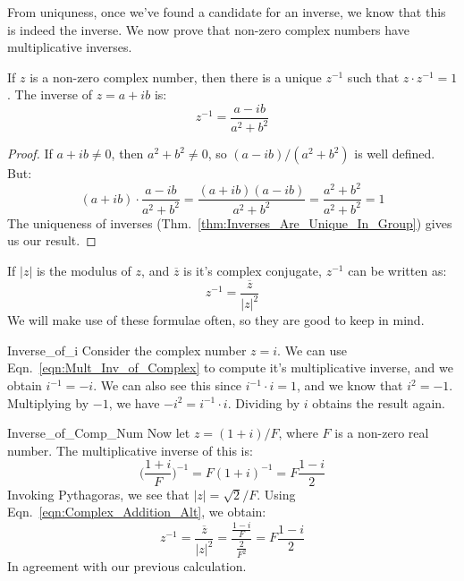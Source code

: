     From uniquness, once we've found a candidate for an inverse, we know
    that this is indeed the inverse. We now prove
    that non-zero complex numbers have multiplicative inverses.
    \begin{theorem}
        \label{thm:Complex_Inverse}%
        If $z$ is a non-zero complex number, then there is a unique
        $z^{\minus{1}}$ such that $z\cdot{z}^{\minus{1}}=1$.
        The inverse of $z=a+ib$ is:
        \begin{equation}
            \label{eqn:Mult_Inv_of_Complex}%
            z^{\minus{1}}=\frac{a-ib}{a^{2}+b^{2}}
        \end{equation}
    \end{theorem}
    \begin{proof}
        If $a+ib\ne{0}$, then $a^2+b^2\ne{0}$, so
        $(a-ib)/(a^2+b^2)$ is well defined. But:
        \begin{equation}
            (a+ib)\cdot\frac{a-ib}{a^2+b^2}=\frac{(a+ib)(a-ib)}{a^2+b^2}
                                           =\frac{a^2+b^2}{a^2+b^2}=1
        \end{equation}
        The uniqueness of inverses
        (Thm.~\ref{thm:Inverses_Are_Unique_In_Group}) gives us our result.
    \end{proof}
    If $|z|$ is the modulus of $z$, and $\overline{z}$ is it's complex
    conjugate, $z^{\minus{1}}$ can be written as:
    \begin{equation}
        \label{eqn:Complex_Addition_Alt}%
        z^{\minus{1}}=\frac{\overline{z}}{|z|^{2}}
    \end{equation}
    We will make use of these formulae often, so they are
    good to keep in mind.
    \begin{lexample}{}{Inverse_of_i}
        Consider the complex number $z=i$. We can use
        Eqn.~\ref{eqn:Mult_Inv_of_Complex} to compute it's
        multiplicative inverse, and we obtain $i^{\minus{1}}=\minus{i}$.
        We can also see this since $i^{\minus{1}}\cdot{i}=1$, and we
        know that $i^{2}=\minus{1}$. Multiplying by $\minus{1}$,
        we have $\minus{i}^{2}=i^{\minus{1}}\cdot{i}$. Dividing by $i$
        obtains the result again.
    \end{lexample}
    \begin{lexample}{}{Inverse_of_Comp_Num}
        Now let $z=(1+i)/F$, where $F$ is a non-zero real number.
        The multiplicative inverse of this is:
        \begin{equation}
            \Big(\frac{1+i}{F}\Big)^{\minus{1}}=F(1+i)^{\minus{1}}
                                               =F\frac{1-i}{2}
        \end{equation}
        Invoking Pythagoras, we see that $|z|=\sqrt{2}/F$.
        Using Eqn.~\ref{eqn:Complex_Addition_Alt}, we obtain:
        \begin{equation}
            z^{\minus{1}}=\frac{\overline{z}}{|z|^{2}}
                         =\frac{\frac{1-i}{F}}{\frac{2}{F^{2}}}
                         =F\frac{1-i}{2}
        \end{equation}
        In agreement with our previous calculation.
    \end{lexample}
